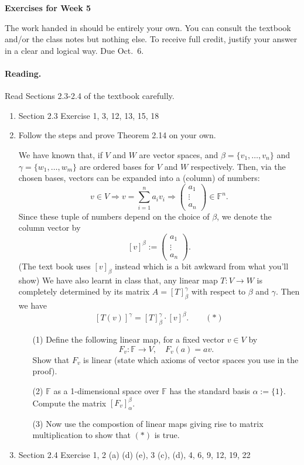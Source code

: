 \documentclass[11pt]{article}
\theoremstyle{plain}
\theoremstyle{definition}
\def\F{\mathbb F}
\def\lra{\longrightarrow}
\begin{document}
\begin{center}
{\Large \bf Exercises for Week 5}
\end{center}
The work handed in should be entirely your own. You can consult the textbook and/or the class notes but nothing else. To receive full credit, justify your answer in a clear and logical way. Due Oct.~6.

\paragraph{Reading.} Read Sections 2.3-2.4 of the textbook carefully.

\begin{enumerate}
\item Section 2.3 Exercise 1, 3, 12, 13, 15, 18
\item Follow the steps and prove Theorem 2.14 on your own.

We have known that, if $V$ and $ W$ are vector spaces, and $\beta=\{v_1,\dots, v_n\}$ and $\gamma=\{w_1,\dots, w_m\}$ are ordered bases for $V$ and $W$ respectively. Then, via the chosen bases, vectors can be expanded into a (column) of numbers:
\[
v\in V \Rightarrow v=\sum_{i=1}^n a_i v_i \Rightarrow 
\left(
\begin{matrix}
a_1\\
\vdots\\
a_n
\end{matrix}
\right)\in \F^n.
\] 
Since these tuple of numbers depend on the choice of $\beta$, we denote the column vector by
\[
[v]^{\beta}:=
\left(
\begin{matrix}
a_1\\
\vdots\\
a_n
\end{matrix}
\right).
\]
(The text book uses $[v]_{\beta}$ instead which is a bit awkward from what you'll show)
We have also learnt in class that, any linear map $T:V\lra W$ is completely determined by its matrix $A=[T]_\beta^\gamma$ with respect to $\beta$ and $\gamma$. Then we have
\[
[T(v)]^{\gamma}=[T]_{\beta}^{\gamma}\cdot [v]^{\beta}. \quad \quad (*)
\]
\begin{enumerate}
\item[(1)] Define the following linear map, for a fixed vector $v\in V$ by
\[
F_v: \F \lra V,\quad F_v(a)=av.
\]
Show that $F_v$ is linear (state which axioms of vector spaces you use in the proof).
\item[(2)] $\F$ as a 1-dimensional space over $\F$ has the standard basis $\alpha:=\{1\}$. Compute the matrix $[F_v]_{\alpha}^\beta$.
\item[(3)] Now use the compostion of linear maps giving rise to matrix multiplication to show that $(*)$ is true.
\end{enumerate}


\item Section 2.4 Exercise 1, 2 (a) (d) (e), 3 (c), (d), 4, 6, 9, 12, 19, 22 
\end{enumerate}
\end{document}
